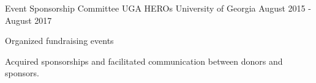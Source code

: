 \begin{cventries}
  \cventry
    {Event Sponsorship Committee}
    {UGA HEROs}
    {University of Georgia}
    {August 2015 - August 2017}
    {
      \begin{cvitems}
        \item {Organized fundraising events}
        \item {Acquired sponsorships and facilitated communication between donors and sponsors.}
      \end{cvitems}
    }
\end{cventries}

